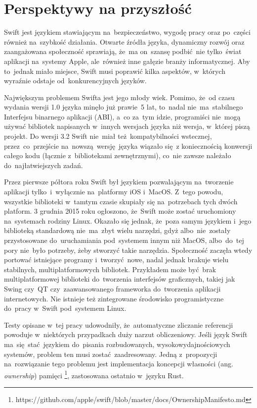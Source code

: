 \documentclass[mgr, shortabstract]{iithesis}
\newcommand{\ang}[1]{ang. \textit{#1}}
\begin{document}
\section{Perspektywy na przyszłość}

Swift jest językiem stawiającym na~bezpieczeństwo, wygodę pracy oraz po~części również na~szybkość działania. Otwarte źródła języka, dynamiczny rozwój oraz zaangażowana społeczność sprawiają, że~ma on~szansę podbić nie tylko~świat aplikacji na~systemy Apple, ale~również inne gałęzie branży informatycznej. Aby to~jednak miało miejsce, Swift musi poprawić kilka aspektów, w~których wyraźnie odstaje od~konkurencyjnych języków.

Największym problemem Swifta jest jego młody wiek. Pomimo, że~od czasu wydania wersji 1.0 języka minęło już prawie 5 lat, to~nadal nie~ma~stabilnego Interfejsu binarnego aplikacji (ABI), a~co za~tym idzie, programiści nie~mogą używać bibliotek napisanych w~innych wersjach języka niż wersja, w~której piszą projekt. Do wersji 3.2 Swift nie~miał też kompatybilności wstecznej, przez~co~przejście na~nowszą wersję języka wiązało się z koniecznością konwersji całego kodu (łącznie z~bibliotekami zewnętrznymi), co~nie zawsze należało do~najłatwiejszych zadań.

Przez pierwsze półtora roku Swift był językiem pozwalającym na~tworzenie aplikacji tylko~i~wyłącznie na~platformy iOS i~MacOS. Z~tego powodu, wszystkie biblioteki w~tamtym czasie skupiały się na~potrzebach tych dwóch platform. 3 grudnia 2015 roku ogłoszono, że~Swift może zostać uruchomiony na~systemach rodziny Linux. Okazało się jednak, że~poza samym językiem i~jego biblioteką standardową nie~ma~zbyt wielu narzędzi, gdyż albo~nie~zostały przystosowane do~uruchamiania pod~systemem innym niż MacOS, albo~do~tej pory nie~było potrzeby, żeby stworzyć takie narzędzia. Społeczność zaczęła wtedy portować istniejące programy i~tworzyć nowe, nadal jednak brakuje wielu stabilnych, multiplatformowych bibliotek. Przykładem może być brak multiplatformowej biblioteki do~tworzenia interfejsów graficznych, takiej jak Swing czy~QT czy~zaawansowanego frameworka do~tworzenia aplikacji internetowych. Nie istnieje też zintegrowane środowisko programistyczne do~pracy w~Swift pod~systemem Linux.

Testy opisane w~tej pracy udowodniły, że~automatyczne zliczanie referencji powoduje w~niektórych przypadkach duży narzut obliczeniowy. Jeśli język Swift ma~się stać językiem do~pisania rozbudowanych, wysokowydajnościowych systemów, problem ten musi zostać zaadresowany. Jedną z~propozycji na~rozwiązanie tego problemu jest implementacja koncepcji własności (\ang{ownership}) pamięci \footnote{https://github.com/apple/swift/blob/master/docs/OwnershipManifesto.md}, zastosowana ostatnio w~języku Rust. 
\end{document}
